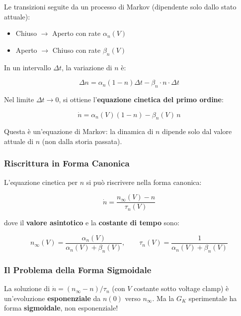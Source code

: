 Le transizioni seguite da un processo di Markov (dipendente solo dallo stato attuale):
\begin{itemize}
    \item Chiuso $\rightarrow$ Aperto con rate $\alpha_n(V)$
    \item Aperto $\rightarrow$ Chiuso con rate $\beta_n(V)$
\end{itemize}

In un intervallo $\Delta t$, la variazione di $n$ è:

\begin{equation}
\Delta n = \alpha_n(1-n)\Delta t - \beta_n \cdot n \cdot \Delta t
\end{equation}

Nel limite $\Delta t \to 0$, si ottiene l'\textbf{equazione cinetica del primo ordine}:

\begin{equation}
\dot{n} = \alpha_n(V)(1 - n) - \beta_n(V) \, n
\end{equation}

Questa è un'equazione di Markov: la dinamica di $n$ dipende solo dal valore attuale di $n$ (non dalla storia passata).


\subsubsection{Riscrittura in Forma Canonica}

L'equazione cinetica per $n$ si può riscrivere nella forma canonica:

\begin{equation}
\dot{n} = \frac{n_\infty(V) - n}{\tau_n(V)}
\end{equation}

dove il \textbf{valore asintotico} e la \textbf{costante di tempo} sono:

\begin{equation}
n_\infty(V) = \frac{\alpha_n(V)}{\alpha_n(V) + \beta_n(V)}, \qquad \tau_n(V) = \frac{1}{\alpha_n(V) + \beta_n(V)}
\end{equation}


\subsubsection{Il Problema della Forma Sigmoidale}

La soluzione di $\dot{n} = (n_\infty - n)/\tau_n$ (con $V$ costante sotto voltage clamp) è un'evoluzione \textbf{esponenziale} da $n(0)$ verso $n_\infty$. Ma la $G_K$ sperimentale ha forma \textbf{sigmoidale}, non esponenziale!

